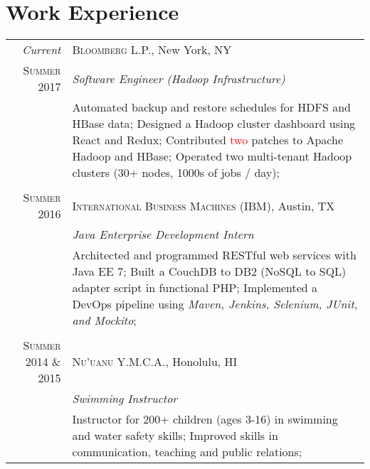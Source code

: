 \documentclass[a4paper,10pt]{article}
\begin{document}
\section{Work Experience}
\begin{tabular}{r|p{11cm}}

\emph{Current} & \textsc{\color{medRed}Bloomberg L.P.}, New York, NY \\
\textsc{Summer 2017}&\emph{Software Engineer (Hadoop Infrastructure)} \\
&\footnotesize{
Automated backup and restore schedules for HDFS and HBase data; \newline
Designed a Hadoop cluster dashboard using React and Redux; \newline
Contributed \textcolor{red}{two} patches to Apache Hadoop and HBase; \newline
Operated two multi-tenant Hadoop clusters (30+ nodes, 1000s of jobs / day); 
}\\\multicolumn{2}{c}{} \\

\textsc{Summer 2016} & \textsc{\color{medRed}International Business Machines (IBM)}, Austin, TX \\
&\emph{Java Enterprise Development Intern} \\
&\footnotesize{
Architected and programmed RESTful web services with Java EE 7; \newline
Built a CouchDB to DB2 (NoSQL to SQL) adapter script in functional PHP; \newline
Implemented a DevOps pipeline using \textit{Maven, Jenkins, Selenium, JUnit, and Mockito};  
}\\ \multicolumn{2}{c}{} \\

\textsc{Summer 2014 \& 2015} & \textsc{\color{medRed}Nu'uanu Y.M.C.A.}, Honolulu, HI \\
&\emph{Swimming Instructor} \\
&\footnotesize{
Instructor for 200+ children (ages 3-16) in swimming and water safety skills; \newline
Improved skills in communication, teaching and public relations; \newline
}\end{tabular}

\end{document}
